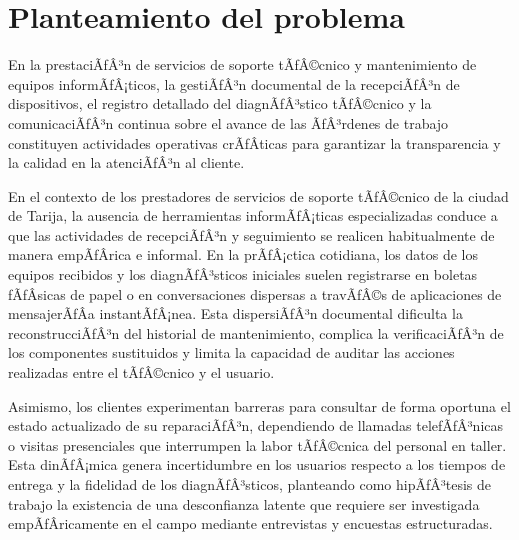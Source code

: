 \section{Planteamiento del problema}

En la prestaciÃƒÂ³n de servicios de soporte tÃƒÂ©cnico y mantenimiento de equipos informÃƒÂ¡ticos, la gestiÃƒÂ³n documental de la recepciÃƒÂ³n de dispositivos, el registro detallado del diagnÃƒÂ³stico tÃƒÂ©cnico y la comunicaciÃƒÂ³n continua sobre el avance de las ÃƒÂ³rdenes de trabajo constituyen actividades operativas crÃƒÂ­ticas para garantizar la transparencia y la calidad en la atenciÃƒÂ³n al cliente.

En el contexto de los prestadores de servicios de soporte tÃƒÂ©cnico de la ciudad de Tarija, la ausencia de herramientas informÃƒÂ¡ticas especializadas conduce a que las actividades de recepciÃƒÂ³n y seguimiento se realicen habitualmente de manera empÃƒÂ­rica e informal. En la prÃƒÂ¡ctica cotidiana, los datos de los equipos recibidos y los diagnÃƒÂ³sticos iniciales suelen registrarse en boletas fÃƒÂ­sicas de papel o en conversaciones dispersas a travÃƒÂ©s de aplicaciones de mensajerÃƒÂ­a instantÃƒÂ¡nea. Esta dispersiÃƒÂ³n documental dificulta la reconstrucciÃƒÂ³n del historial de mantenimiento, complica la verificaciÃƒÂ³n de los componentes sustituidos y limita la capacidad de auditar las acciones realizadas entre el tÃƒÂ©cnico y el usuario.

Asimismo, los clientes experimentan barreras para consultar de forma oportuna el estado actualizado de su reparaciÃƒÂ³n, dependiendo de llamadas telefÃƒÂ³nicas o visitas presenciales que interrumpen la labor tÃƒÂ©cnica del personal en taller. Esta dinÃƒÂ¡mica genera incertidumbre en los usuarios respecto a los tiempos de entrega y la fidelidad de los diagnÃƒÂ³sticos, planteando como hipÃƒÂ³tesis de trabajo la existencia de una desconfianza latente que requiere ser investigada empÃƒÂ­ricamente en el campo mediante entrevistas y encuestas estructuradas.
